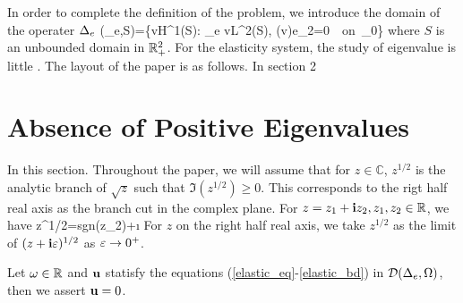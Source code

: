 \documentclass[12pt]{iopart}
\begin{document}
	In order to complete the definition of the problem, we introduce the domain of the operater $\Delta_e$
	\ben
	(\De_e,S)=\{v\in H^1(S): \De_e v\in L^2(S), \sigma(v)e_2=0\ \ \mbox{on }\Ga_0\}
	\een
	where $S$ is an unbounded domain in ${\mathbb{R}}^2_+$.
	For the elasticity system, the study of eigenvalue is little \cite{sini2004}.  
	The layout of the paper is as follows. In section 2 
	
	\section{Absence of Positive Eigenvalues}
	In this section. Throughout the paper, we will assume that for $z\in\mathbb{C}$, $z^{1/2}$ is the analytic branch of $\sqrt{z}$ such that $\Im (z^{1/2})\geq0$. This corresponds to the rigt half real axis as the branch cut in the complex plane. For $z=z_1+\mathbf{i} z_2,z_1,z_2\in\mathbb{R}$, we have
	\be \label{convention_1}
	z^{1/2}=sgn(z_2)+\i{}
	\ee
	For $z$ on the right half real axis, we take $z^{1/2}$ as the limit of $(z+\mathbf{i}\varepsilon)^{1/2}$ as $\varepsilon \to 0^+$.
	\begin{thm}\label{2.1}
		Let $\omega\in {\mathbb{R}}$ and $\mathbf{u}$ statisfy the equations (\ref{elastic_eq}-\ref{elastic_bd}) in $\mathcal{D}(\Delta_e,\Omega)$,
		then we assert $\mathbf{u}=0$.
	\end{thm}
\end{document}
